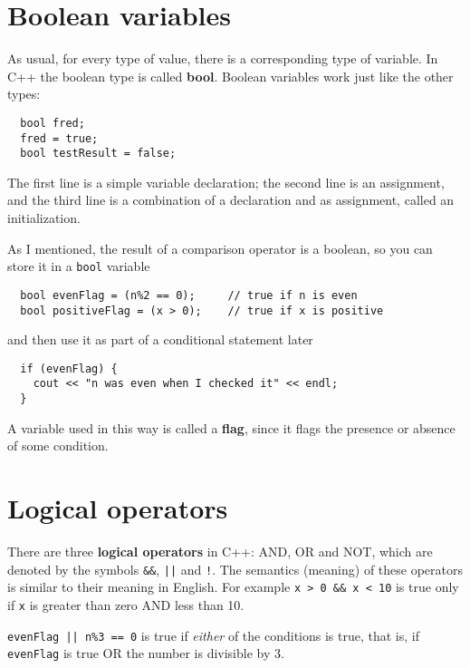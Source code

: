 \section{Boolean variables}

As usual, for every type of value, there is a corresponding
type of variable.  In C++ the boolean type is called {\bf bool}.
Boolean variables work just like the other types:

\begin{verbatim}
  bool fred;
  fred = true;
  bool testResult = false;
\end{verbatim}
%
The first line is a simple variable declaration;
the second line is an assignment, and the third line is a
combination of a declaration and as assignment, 
called an initialization.


As I mentioned, the result of a comparison operator is a boolean,
so you can store it in a {\tt bool} variable

\begin{verbatim}
  bool evenFlag = (n%2 == 0);     // true if n is even
  bool positiveFlag = (x > 0);    // true if x is positive
\end{verbatim}
%
and then use it as part of a conditional statement later

\begin{verbatim}
  if (evenFlag) {
    cout << "n was even when I checked it" << endl;
  }
\end{verbatim}
%
A variable used in this way is called a {\bf flag},
since it flags the presence or absence of some condition.


\section{Logical operators}

There are three {\bf logical operators} in C++: AND, OR and NOT,
which are denoted by the symbols {\tt \&\&}, {\tt ||} and
{\tt !}.  The semantics (meaning) of these operators is similar
to their meaning in English.  For example {\tt x > 0 \&\& x < 10}
is true only if {\tt x} is greater than zero AND less than 10.


{\tt evenFlag || n\%3 == 0} is true if {\em either} of
the conditions is true, that is, if {\tt evenFlag} is true OR the
number is divisible by 3.

